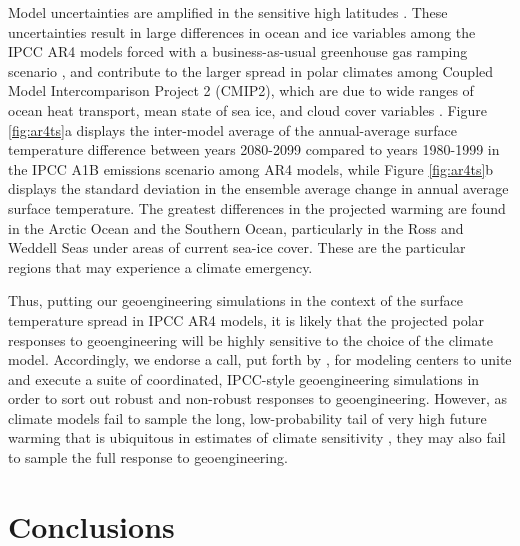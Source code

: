 \documentclass[12pt]{article}
\newcommand{\chapdef}{\section} %
\begin{document}
Model uncertainties are amplified in the sensitive high latitudes \citep{randall07, deweaver07}. These uncertainties result in large differences in ocean and ice variables among the IPCC AR4 models forced with a business-as-usual greenhouse gas ramping scenario \citep{meehl07}, and contribute to the larger spread in polar climates among Coupled Model Intercomparison Project 2 (CMIP2), which are due to wide ranges of ocean heat transport, mean state of sea ice, and cloud cover variables \citep{holland03, holland01, bitz08}. Figure \ref{fig:ar4ts}a displays the inter-model average of the annual-average surface temperature difference between years 2080-2099 compared to years 1980-1999 in the IPCC A1B emissions scenario among AR4 models, while Figure \ref{fig:ar4ts}b displays the standard deviation in the ensemble average change in annual average surface temperature. The greatest differences in the projected warming are found in the Arctic Ocean and the Southern Ocean, particularly in the Ross and Weddell Seas under areas of current sea-ice cover. These are the particular regions that may experience a climate emergency. 

Thus, putting our geoengineering simulations in the context of the surface temperature spread in IPCC AR4 models, it is likely that the projected polar responses to geoengineering will be highly sensitive to the choice of the climate model. Accordingly, we endorse a call, put forth by \cite{kravitz11}, for modeling centers to unite and execute a suite of coordinated, IPCC-style geoengineering simulations in order to sort out robust and non-robust responses to geoengineering. However, as climate models fail to sample the long, low-probability tail of very high future warming that is ubiquitous in estimates of climate sensitivity \citep{randall07, knutti08, roe07}, they may also fail to sample the full response to geoengineering. 

\chapdef{Conclusions}
\label{sec:conc}
\end{document}
